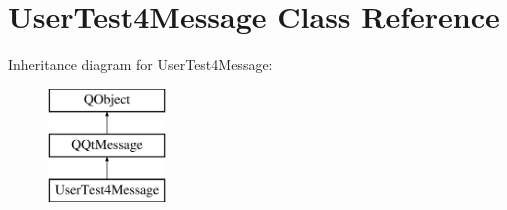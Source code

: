\hypertarget{class_user_test4_message}{}\section{User\+Test4\+Message Class Reference}
\label{class_user_test4_message}
Inheritance diagram for User\+Test4\+Message\+:\begin{figure}[H]
\begin{center}
\leavevmode
\includegraphics[height=3.000000cm]{class_user_test4_message}
\end{center}
\end{figure}
